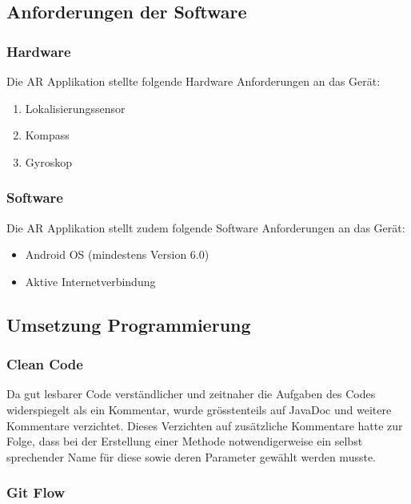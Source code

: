 \documentclass[a4paper]{scrreprt}
\begin{document}
\subsection{Anforderungen der Software}

\subsubsection{Hardware}

Die AR Applikation stellte folgende Hardware Anforderungen an das Gerät:

\begin{enumerate}
	\item Lokalisierungssensor
	\item Kompass
	\item Gyroskop
\end{enumerate}

\subsubsection{Software}

Die AR Applikation stellt zudem folgende Software Anforderungen an das Gerät:

\begin{itemize}
	\item Android OS (mindestens Version 6.0)
	\item Aktive Internetverbindung
\end{itemize}

\subsection{Umsetzung Programmierung}

\subsubsection{Clean Code}

Da gut lesbarer Code verständlicher und zeitnaher die Aufgaben des Codes widerspiegelt als ein Kommentar, wurde grösstenteils auf JavaDoc und weitere Kommentare verzichtet. Dieses Verzichten auf zusätzliche Kommentare hatte zur Folge, dass bei der Erstellung einer Methode notwendigerweise ein selbst sprechender Name für diese sowie deren Parameter gewählt werden musste.

\subsubsection{Git Flow}
\end{document}
